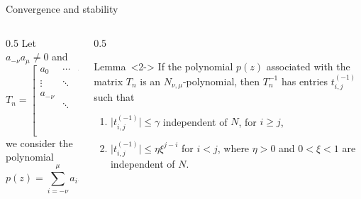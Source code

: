 \documentclass[aspectratio=169,xcolor=dvipsnames]{beamer}
\begin{document}
\begin{frame}{Convergence and stability}

\begin{columns}
\begin{column}{0.5\columnwidth}
Let $a_{-\nu}a_\mu \neq 0$ and 
\[
T_n = \begin{bmatrix}
	a_{0} & \cdots & a_{\mu} \\
	\vdots & \ddots &  & \ddots \\
	a_{-\nu} &  & \ddots & & \ddots \\
	& \ddots &  & \ddots & &a_{\mu} \\
	& & \ddots &  &\ddots & \vdots \\
	& & & a_{-\nu} & \cdots & a_0
\end{bmatrix},
\]
we consider the polynomial
\[
p(z) = \sum_{i=-\nu}^{\mu} a_i z^{\nu + i}.
\]
\end{column}
\begin{column}{0.5\columnwidth}\vspace{-1em}
\begin{alertblock}{Lemma~\parencite[Lemma 4.4.4]{MR1673796}}<2->
If the polynomial $p(z)$ associated with the matrix $T_n$ is an $N_{\nu,\mu}$-polynomial, then $T_n^{-1}$ has entries $t_{i,j}^{(-1)}$ such that
\begin{enumerate}
	\item $\lvert t_{i,j}^{(-1)} \rvert \leq \gamma $ independent of $N$, for $ i \geq j$,
	\item $\lvert t_{i,j}^{(-1)} \rvert \leq \eta \xi^{j-i}$ for $i < j$, where $\eta > 0$ and $0 < \xi < 1$ are independent of $N$.
\end{enumerate}
\end{alertblock}
\end{column}
\end{columns}

\end{frame}
\end{document}
